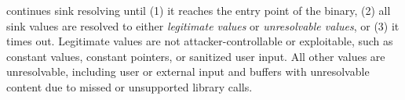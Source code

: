 \mango continues sink resolving until (1) it reaches the entry point of the binary, (2) all sink values are resolved to either \emph{legitimate values} or \emph{unresolvable values}, or (3) it times out.
Legitimate values are not attacker-controllable or exploitable, such as constant values, constant pointers, or sanitized user input.
All other values are unresolvable, including user or external input and buffers with unresolvable content due to missed or unsupported library calls.




% 

